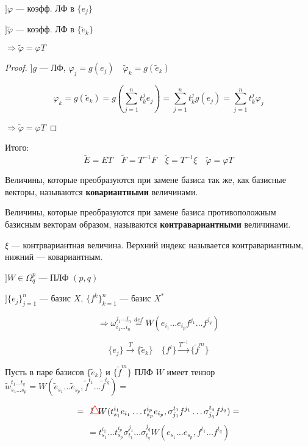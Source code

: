 \begin{lemma}
    $]\varphi$ --- коэфф. ЛФ в $\{e_j\}$

    $]\tilde\varphi$ --- коэфф. ЛФ в $\{\tilde e_k\}$

    $\Rightarrow \tilde \varphi = \varphi T$
\end{lemma}
\begin{proof}
    $] g$ --- ЛФ, $\varphi_j=g(e_j) \quad \tilde \varphi_k = g(\tilde e_k)$

    $$\varphi_k=g(\tilde e_k) = g\left(\sum\limits_{j=1}^n t_k^j e_j\right)=\sum\limits_{j=1}^n t_k^j g(e_j)=\sum\limits_{j=1}^n t_k^j\varphi_j$$

    $\Rightarrow \tilde \varphi = \varphi T$
\end{proof}

Итого:
$$\tilde E = ET \quad \tilde F = T^{-1}F \quad \tilde\xi = T^{-1}\xi \quad \tilde \varphi = \varphi T$$

\begin{definition}
    Величины, которые преобразуются при замене базиса так же, как базисные векторы, называются \textbf{ковариантными} величинами.

    Величины, которые преобразуются при замене базиса противоположным базисным векторам образом, называются \textbf{контравариантными} величинами.    
\end{definition}

\begin{remark}
    $\xi$ --- контрвариантная величина. Верхний индекс называется контравариантным, нижний --- ковариантным.
\end{remark}

$] W\in\Omega^p_q$ --- ПЛФ $(p, q)$

$] \{e_j\}_{j=1}^n$ --- базис $X$, $\{f^k\}_{k=1}^n$ --- базис $X^*$

$$\Rightarrow \omega^{j_1\ldots j_n}_{i_1\ldots i_n} \stackrel{def}{=} W(e_{i_1}\ldots e_{i_p}f^{j_1}\ldots f^{j_q})$$

$$\{e_j\}\xrightarrow{T} \{\tilde e_k\} \quad \{f^l\}\xrightarrow{T^{-1}} \{\tilde f^m\}$$

Пусть в паре базисов $\{\tilde e_k\}$ и $\{\tilde f^m\}$ ПЛФ $W$ имеет тензор $\tilde w_{s_1\ldots s_p}^{t_1\ldots t_q}=W(\tilde e_{s_1}\ldots \tilde e_{s_p}, \tilde f^{t_1}\ldots \tilde f^{t_q})=$

$$=\Warning W(t_{s_1}^{i_1}e_{i_1} \ldots t_{s_p}^{i_p}e_{i_p}, \sigma_{j_1}^{t_1}f^{j_1}\ldots \sigma_{j_q}^{t_q}f^{j_q})=$$
$$=t^{i_1}_{s_1}\ldots t^{i_p}_{s_p} \sigma^{j_1}_{t_1}\ldots \sigma^{j_q}_{t_q}W(e_{s_1}\ldots e_{s_p}, f^{t_1}\ldots f^{t_q})$$

